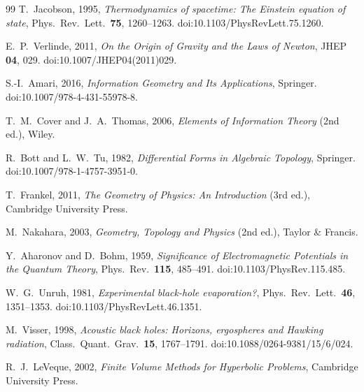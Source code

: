 \documentclass[11pt]{article}
\begin{document}
\begin{thebibliography}{99}
        T.~Jacobson, 1995,
        \textit{Thermodynamics of spacetime: The Einstein equation of state},
        Phys.\ Rev.\ Lett.\ \textbf{75}, 1260--1263.
        doi:10.1103/PhysRevLett.75.1260.

        E.~P.~Verlinde, 2011,
        \textit{On the Origin of Gravity and the Laws of Newton},
        JHEP \textbf{04}, 029.
        doi:10.1007/JHEP04(2011)029.

        S.-I.~Amari, 2016,
        \textit{Information Geometry and Its Applications},
        Springer.
        doi:10.1007/978-4-431-55978-8.

        T.~M.~Cover and J.~A.~Thomas, 2006,
        \textit{Elements of Information Theory} (2nd ed.),
        Wiley.

        R.~Bott and L.~W.~Tu, 1982,
        \textit{Differential Forms in Algebraic Topology},
        Springer.
        doi:10.1007/978-1-4757-3951-0.

        T.~Frankel, 2011,
        \textit{The Geometry of Physics: An Introduction} (3rd ed.),
        Cambridge University Press.

        M.~Nakahara, 2003,
        \textit{Geometry, Topology and Physics} (2nd ed.),
        Taylor \& Francis.

        Y.~Aharonov and D.~Bohm, 1959,
        \textit{Significance of Electromagnetic Potentials in the Quantum Theory},
        Phys.\ Rev.\ \textbf{115}, 485--491.
        doi:10.1103/PhysRev.115.485.

        W.~G.~Unruh, 1981,
        \textit{Experimental black-hole evaporation?},
        Phys.\ Rev.\ Lett.\ \textbf{46}, 1351--1353.
        doi:10.1103/PhysRevLett.46.1351.

        M.~Visser, 1998,
        \textit{Acoustic black holes: Horizons, ergospheres and Hawking radiation},
        Class.\ Quant.\ Grav.\ \textbf{15}, 1767--1791.
        doi:10.1088/0264-9381/15/6/024.

        R.~J.~LeVeque, 2002,
        \textit{Finite Volume Methods for Hyperbolic Problems},
        Cambridge University Press.


\end{thebibliography}
\end{document}
